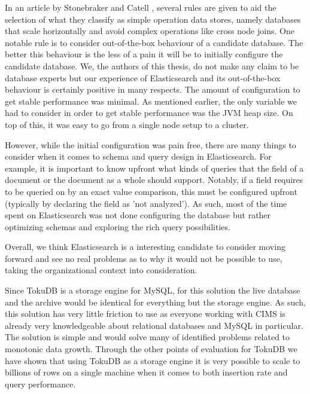 In an article by Stonebraker and Catell \cite{10rules}, several rules are given to aid the selection of what they classify as simple operation data stores, namely databases that scale horizontally and avoid complex operations like cross node joins. One notable rule is to consider out-of-the-box behaviour of a candidate database. The better this behaviour is the less of a pain it will be to initially configure the candidate database. We, the authors of this thesis, do not make any claim to be database experts but our experience of Elasticsearch and its out-of-the-box behaviour is certainly positive in many respects. The amount of configuration to get stable performance was minimal. As mentioned earlier, the only variable we had to consider in order to get stable performance was the JVM heap size. On top of this, it was easy to go from a single node setup to a cluster. 

However, while the initial configuration was pain free, there are many things to consider when it comes to schema and query design in Elasticsearch. For example, it is important to know upfront what kinds of queries that the field of a document or the document as a whole should support. Notably, if a field requires to be queried on by an exact value comparison, this must be configured upfront (typically by declaring the field as 'not analyzed'). As such, most of the time spent on Elasticsearch was not done configuring the database but rather optimizing schemas and exploring the rich query possibilities.

Overall, we think Elasticsearch is a interesting candidate to consider moving forward and see no real problems as to why it would not be possible to use, taking the organizational context into consideration.

Since TokuDB is a storage engine for MySQL, for this solution the live database and the archive would be identical for everything but the storage engine. As such, this solution has very little friction to use as everyone working with CIMS is already very knowledgeable about relational databases and MySQL in particular. The solution is simple and would solve many of identified problems related to monotonic data growth. Through the other points of evaluation for TokuDB we have shown that using TokuDB as a storage engine it is very possible to scale to billions of rows on a single machine when it comes to both insertion rate and query performance.